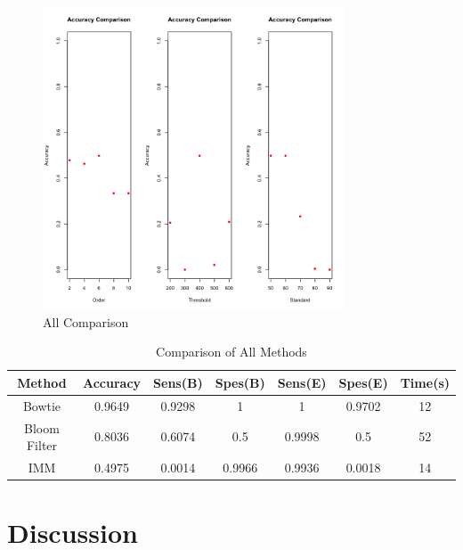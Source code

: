\documentclass[12pt]{article} %
\begin{document}
\begin{figure}
\centering
\includegraphics[width=0.8\textwidth]{all.png}
\caption{All Comparison}
\label{fig: all}
\end{figure}

\begin{table}
\begin{tabular}{|c|c|c|c|c|c|c|}
\hline
Method & Accuracy & Sens(B) & Spes(B) & Sens(E) & Spes(E) & Time(s) \\
\hline
Bowtie & 0.9649 & 0.9298 & 1 & 1 & 0.9702 & 12 \\
\hline
Bloom Filter & 0.8036 & 0.6074 & 0.5 & 0.9998 & 0.5 & 52 \\
\hline
IMM & 0.4975 & 0.0014 & 0.9966 & 0.9936 & 0.0018 & 14 \\
\hline
\end{tabular}
\caption{Comparison of All Methods}
\label{tab: all_comp}
\end{table}

\section{Discussion}
\end{document}
